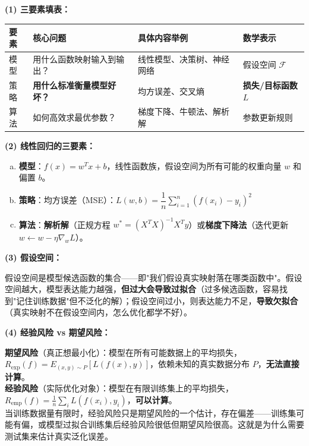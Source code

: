 \documentclass[a4paper,11pt]{ctexart}
\begin{document}
\begin{solutionbox}[参考答案与详细解析]
    \textbf{(1) 三要素填表：}
    \begin{center}
    \begin{tabular}{p{2cm} p{4cm} p{4.5cm} p{2.5cm}}
        \toprule
        要素 & 核心问题 & 具体内容举例 & 数学表示 \\
        \midrule
        模型 & 用什么函数映射输入到输出？ & 线性模型、决策树、神经网络 & 假设空间 $\mathcal{F}$ \\[0.8em]
        策略 & \textbf{用什么标准衡量模型好坏？} & 均方误差、交叉熵 & \textbf{损失/目标函数 $L$} \\[0.8em]
        算法 & 如何高效求最优参数？ & 梯度下降、牛顿法、解析解 & 参数更新规则 \\
        \bottomrule
    \end{tabular}
    \end{center}

    \textbf{(2) 线性回归的三要素：}
    \begin{enumerate}[a.]
        \item \textbf{模型}：$f(x) = w^T x + b$，线性函数族，假设空间为所有可能的权重向量 $w$ 和偏置 $b$。
        \item \textbf{策略}：均方误差（MSE）：$L(w,b) = \dfrac{1}{n}\sum_{i=1}^n (f(x_i) - y_i)^2$
        \item \textbf{算法}：\textbf{解析解}（正规方程 $w^* = (X^TX)^{-1}X^Ty$）或\textbf{梯度下降法}（迭代更新 $w \leftarrow w - \eta\nabla_w L$）。
    \end{enumerate}

    \textbf{(3) 假设空间：}

    假设空间是模型候选函数的集合——即"我们假设真实映射落在哪类函数中"。假设空间越大，模型表达能力越强，\textbf{但过大会导致过拟合}（过多候选函数，容易找到"记住训练数据"但不泛化的解）；假设空间过小，则表达能力不足，\textbf{导致欠拟合}（真实映射不在假设空间内，怎么优化都学不好）。

    \textbf{(4) 经验风险 vs 期望风险：}

    \begin{keybox}[两种风险的本质区别]
        \textbf{期望风险}（真正想最小化）：模型在所有可能数据上的平均损失，$R_{\exp}(f) = E_{(x,y)\sim P}[L(f(x), y)]$，依赖未知的真实数据分布 $P$，\textbf{无法直接计算}。\\
        \textbf{经验风险}（实际优化对象）：模型在有限训练集上的平均损失，$R_{\text{emp}}(f) = \frac{1}{n}\sum_i L(f(x_i), y_i)$，\textbf{可以计算}。\\
        当训练数据量有限时，经验风险只是期望风险的一个估计，存在偏差——训练集可能有偏，或模型过拟合训练集后经验风险很低但期望风险很高。这就是为什么需要测试集来估计真实泛化误差。
    \end{keybox}
\end{solutionbox}
\end{document}
